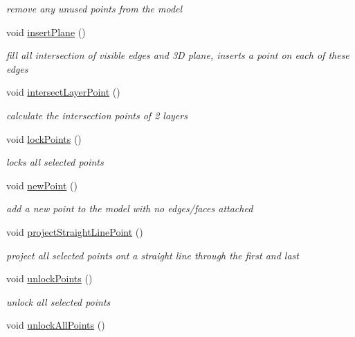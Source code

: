 \begin{DoxyCompactItemize}
\begin{DoxyCompactList}\small\item\em remove any unused points from the model \end{DoxyCompactList}\item 
void \hyperlink{classShipCAD_1_1Controller_aed43429330b5062ddb98372406a02d2d}{insert\-Plane} ()
\begin{DoxyCompactList}\small\item\em fill all intersection of visible edges and 3\-D plane, inserts a point on each of these edges \end{DoxyCompactList}\item 
void \hyperlink{classShipCAD_1_1Controller_a2a4079dc0201ed5e22776fbe942143f2}{intersect\-Layer\-Point} ()
\begin{DoxyCompactList}\small\item\em calculate the intersection points of 2 layers \end{DoxyCompactList}\item 
void \hyperlink{classShipCAD_1_1Controller_ad447a70b9f88ca1b9a81492fc3b86e2b}{lock\-Points} ()
\begin{DoxyCompactList}\small\item\em locks all selected points \end{DoxyCompactList}\item 
void \hyperlink{classShipCAD_1_1Controller_a0770afe637ab88118b6957f20ceb8942}{new\-Point} ()
\begin{DoxyCompactList}\small\item\em add a new point to the model with no edges/faces attached \end{DoxyCompactList}\item 
void \hyperlink{classShipCAD_1_1Controller_aaf39d00fed33f46dea7d5f6a8b5839f1}{project\-Straight\-Line\-Point} ()
\begin{DoxyCompactList}\small\item\em project all selected points ont a straight line through the first and last \end{DoxyCompactList}\item 
void \hyperlink{classShipCAD_1_1Controller_a7038d511c9398f34ec9df3d0a1311b14}{unlock\-Points} ()
\begin{DoxyCompactList}\small\item\em unlock all selected points \end{DoxyCompactList}\item 
void \hyperlink{classShipCAD_1_1Controller_af983f99c449cd485a6362768a64d3c1e}{unlock\-All\-Points} ()

\end{DoxyCompactItemize}
